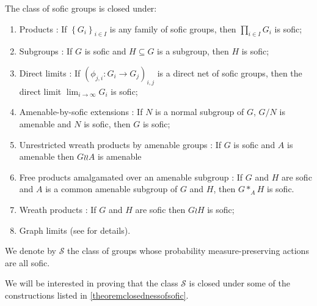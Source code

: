 \begin{theorem}\label{theoremclosednessofsofic}
The class of sofic groups is closed under:
\begin{enumerate}
\item[(a)] Products \cite{MR2220572}: If $\left\{G_i\right\}_{i\in I}$ is any family of sofic groups, then $\prod_{i\in I}G_i$ is sofic;
\item[(b)] Subgroups \cite{MR2220572}: If $G$ is sofic and $H\subseteq G$ is a subgroup, then $H$ is sofic;
\item[(c)] Direct limits \cite{MR2220572}: If $\left(\phi_{j,i}: G_i\to G_j\right)_{i,j}$ is a direct net of sofic groups, then the direct limit $\lim_{i\to\infty}G_i$ is sofic;
\item[(d)] Amenable-by-sofic extensions \cite{MR2220572}: If $N$ is a normal subgroup of $G$, $G/N$ is amenable and $N$ is sofic, then $G$ is sofic;
\item[(e)] Unrestricted wreath products by amenable groups \cite{arxiv1802.04688v1}: If $G$ is sofic and $A$ is amenable then $G\wr\!\wr A$ is amenable
\item[(f)] Free products amalgamated over an amenable subgroup \cite{MR2826401,MR2823074}: If $G$ and $H$ are sofic and $A$ is a common amenable subgroup of $G$ and $H$, then $G\ast_A H$ is sofic.
\item[(g)] Wreath products \cite{MR3795485}: If $G$ and $H$ are sofic then $G\wr H$ is sofic;
\item[(h)] Graph limits (see \cite{MR2794910} for details).
\end{enumerate}
\end{theorem}

\begin{definition}[{\cite{MR2826401}}]
We denote by $\mathscr{S}$ the class of groups whose probability measure-preserving actions are all sofic.
\end{definition}

We will be interested in proving that the class $\mathscr{S}$ is closed under some of the constructions listed in \ref{theoremclosednessofsofic}. %

